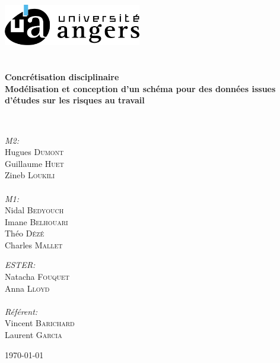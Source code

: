 \begin{titlepage}
    \begin{center}
    
    \includegraphics[width=0.45\textwidth]{./img/ua_h_couleur}~\\[1cm]
    
    \textsc{\Large }\\[0.5cm]
    
    \HRule \\[0.4cm]
    
    {\huge \bfseries Concrétisation disciplinaire\\
    Modélisation et conception d’un schéma pour des données issues d’études sur les risques au travail \\[0.4cm] }
    
    \HRule \\[1.5cm]
    
    \begin{minipage}{0.4\textwidth}
    \begin{flushleft} \large
    \emph{M2:}\\
    Hugues \textsc{Dumont}\\
    Guillaume \textsc{Huet}\\
    Zineb \textsc{Loukili}\\
    \textsc{\Large }\\[0.3cm]
    \emph{M1:}\\
    Nidal \textsc{Bedyouch}\\
    Imane \textsc{Belhouari}\\
    Théo \textsc{Dézé}\\
    Charles \textsc{Mallet}
    \end{flushleft}
    \end{minipage}
    \begin{minipage}{0.4\textwidth}
    \begin{flushright} \large
    \emph{ESTER:}\\
    Natacha \textsc{Fouquet}\\
    Anna \textsc{Lloyd}\\
    \textsc{\Large }\\[0.3cm]
    \emph{Référent:}\\
    Vincent \textsc{Barichard}\\
    Laurent \textsc{Garcia}
    \end{flushright}
    \end{minipage}
    
    \vfill
    
    {\large \today}
    
    \end{center}
    \end{titlepage}